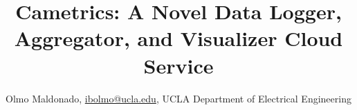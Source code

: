 \documentclass[10pt,a4paper,english]{article}
\title{}
\author{}
\date{}
\newlength{\locallinewidth}
\begin{document}
\setlength{\locallinewidth}{\linewidth}



\title{Cametrics: A Novel Data Logger, Aggregator, and Visualizer Cloud
Service}

\maketitle

\author{Olmo Maldonado, \href{mailto:ibolmo@ucla.edu}{ibolmo@ucla.edu},
UCLA Department of Electrical Engineering}

\maketitle

\pagebreak{}

\hypertarget{contents}{}
\end{document}

